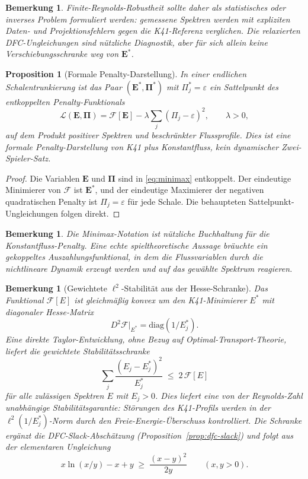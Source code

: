 \documentclass[12pt,a4paper]{article}
\theoremstyle{breakdef}
\theoremstyle{breakplain}
\newtheorem{proposition}[definition]{Proposition}
\theoremstyle{breakdef}
\newtheorem{remark}[definition]{Bemerkung}
\begin{document}
\begin{remark}
Finite-Reynolds-Robustheit sollte daher als statistisches oder inverses
Problem formuliert werden: gemessene Spektren werden mit expliziten
Daten- und Projektionsfehlern gegen die K41-Referenz verglichen. Die
relaxierten DFC-Ungleichungen sind nützliche Diagnostik, aber für sich
allein keine Verschiebungsschranke weg von $\mathbf{E}^*$.
\end{remark}

\begin{proposition}[Formale Penalty-Darstellung]
\label{prop:minimax}
In einer endlichen Schalentrunkierung ist das Paar
$(\mathbf{E}^*,\boldsymbol{\Pi}^*)$ mit $\Pi_j^*=\varepsilon$ ein
Sattelpunkt des entkoppelten Penalty-Funktionals
\begin{equation}\label{eq:minimax}
  \mathcal{L}(\mathbf{E},\boldsymbol{\Pi})
  =
  \mathcal{F}[\mathbf{E}]
  -
  \lambda\sum_j(\Pi_j-\varepsilon)^2,
  \qquad \lambda>0,
\end{equation}
auf dem Produkt positiver Spektren und beschränkter Flussprofile. Dies ist
eine formale Penalty-Darstellung von K41 plus Konstantfluss, kein
dynamischer Zwei-Spieler-Satz.
\end{proposition}

\begin{proof}
Die Variablen $\mathbf{E}$ und $\boldsymbol{\Pi}$ sind in
\eqref{eq:minimax} entkoppelt. Der eindeutige Minimierer von
$\mathcal{F}$ ist $\mathbf{E}^*$, und der eindeutige Maximierer der
negativen quadratischen Penalty ist $\Pi_j=\varepsilon$ für jede Schale.
Die behaupteten Sattelpunkt-Ungleichungen folgen direkt.
\end{proof}

\begin{remark}
Die Minimax-Notation ist nützliche Buchhaltung für die
Konstantfluss-Penalty. Eine echte spieltheoretische Aussage bräuchte ein
gekoppeltes Auszahlungsfunktional, in dem die Flussvariablen durch die
nichtlineare Dynamik erzeugt werden und auf das gewählte Spektrum reagieren.
\end{remark}

\begin{remark}[Gewichtete $\ell^2$-Stabilität aus der Hesse-Schranke]
\label{rem:talagrand}
Das Funktional $\mathcal{F}[E]$ ist gleichmäßig konvex um den
K41-Minimierer $E^*$ mit diagonaler Hesse-Matrix
\[
  D^2\mathcal{F}\big|_{E^*} = \mathrm{diag}(1/E_j^*).
\]
Eine direkte Taylor-Entwicklung, ohne Bezug auf
Optimal-Transport-Theorie, liefert die gewichtete
Stabilitätsschranke
\[
  \sum_j \frac{(E_j - E_j^*)^2}{E_j^*} \;\le\; 2\,\mathcal{F}[E]
\]
für alle zulässigen Spektren $E$ mit $E_j > 0$. Dies liefert eine von
der Reynolds-Zahl unabhängige Stabilitätsgarantie: Störungen des
K41-Profils werden in der $\ell^2(1/E_j^*)$-Norm durch den
Freie-Energie-Überschuss kontrolliert. Die Schranke ergänzt die
DFC-Slack-Abschätzung (Proposition~\ref{prop:dfc-slack}) und folgt aus
der elementaren Ungleichung
\[
  x\ln(x/y) - x + y \;\ge\; \frac{(x-y)^2}{2y}
  \qquad (x,y>0).
\]
\end{remark}
\end{document}
